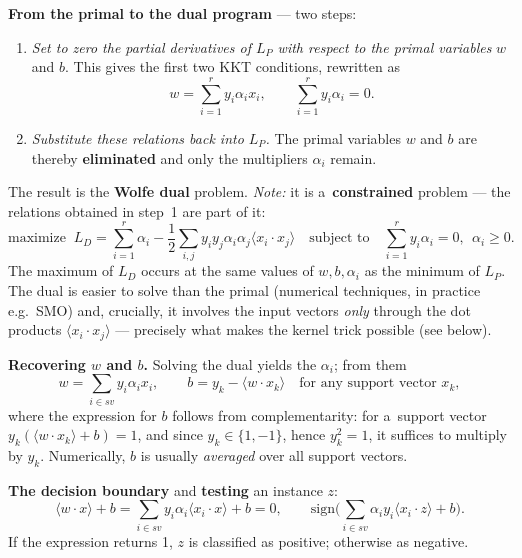 \documentclass[11pt,a4paper]{article}
\theoremstyle{definition}
\begin{document}
\begin{defbox}
\textbf{From the primal to the dual program} --- two steps:
\begin{enumerate}
\item \emph{Set to zero the partial derivatives of $L_P$ with respect to the primal variables}
      $w$ and $b$. This gives the first two KKT conditions, rewritten as
      \[ w=\sum_{i=1}^{r} y_i\alpha_i x_i, \qquad \sum_{i=1}^{r} y_i\alpha_i = 0. \]
\item \emph{Substitute these relations back into $L_P$.} The primal variables $w$ and $b$ are
      thereby \textbf{eliminated} and only the multipliers $\alpha_i$ remain.
\end{enumerate}
The result is the \textbf{Wolfe dual} problem. \emph{Note:} it is a~\textbf{constrained} problem
--- the relations obtained in step~1 are part of it:
\[ \text{maximize }\ L_D=\sum_{i=1}^{r}\alpha_i-\frac12\sum_{i,j}y_iy_j\alpha_i\alpha_j
   \langle x_i\cdot x_j\rangle
   \quad\text{subject to}\quad \sum_{i=1}^{r} y_i\alpha_i=0,\ \ \alpha_i\ge 0. \]
The maximum of $L_D$ occurs at the same values of $w,b,\alpha_i$ as the minimum of $L_P$. The dual
is easier to solve than the primal (numerical techniques, in practice e.g.\ SMO) and, crucially,
it involves the input vectors \emph{only} through the dot products $\langle x_i\cdot x_j\rangle$
--- precisely what makes the kernel trick possible (see below).

\textbf{Recovering $w$ and $b$.} Solving the dual yields the $\alpha_i$; from them
\[ w=\sum_{i\in \mathit{sv}} y_i\alpha_i x_i, \qquad
   b = y_k - \langle w\cdot x_k\rangle \quad\text{for any support vector } x_k, \]
where the expression for $b$ follows from complementarity: for a~support vector
$y_k(\langle w\cdot x_k\rangle+b)=1$, and since $y_k\in\{1,-1\}$, hence $y_k^2=1$, it suffices to
multiply by $y_k$. Numerically, $b$ is usually \emph{averaged} over all support vectors.

\textbf{The decision boundary} and \textbf{testing} an instance $z$:
\[ \langle w\cdot x\rangle+b=\sum_{i\in \mathit{sv}}y_i\alpha_i\langle x_i\cdot x\rangle+b=0,
\qquad
\mathrm{sign}\Big(\sum_{i\in \mathit{sv}}\alpha_iy_i\langle x_i\cdot z\rangle+b\Big). \]
If the expression returns 1, $z$ is classified as positive; otherwise as negative.
\end{defbox}
\end{document}
